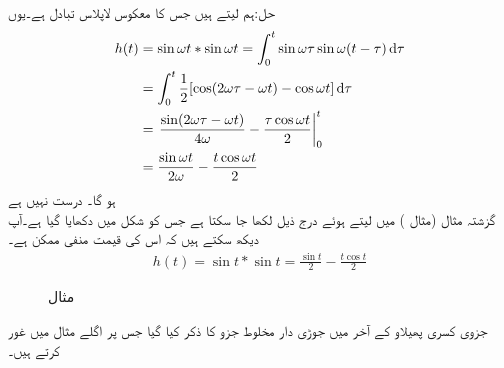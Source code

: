 حل:ہم  لیتے ہیں جس کا معکوس لاپلاس تبادل  ہے۔یوں 
\begin{align*}
h(t)&=\sin \omega t* \sin \omega t=\int_{0}^{t} \sin \omega \tau \sin \omega(t-\tau)\dif \tau\\
&=\int_{0}^{t} \frac{1}{2}[\cos(2\omega \tau-\omega t)-\cos \omega t]\dif \tau\\
&=\left.\frac{\sin(2\omega \tau-\omega t)}{4\omega}-\frac{\tau \cos \omega t}{2}\right|_{0}^{t}\\
&=\frac{\sin \omega t}{2\omega}-\frac{t\cos \omega t}{2}
\end{align*}
ہو گا۔
\quad {} درست نہیں ہے\\
گزشتہ مثال (مثال ) میں   لیتے ہوئے درج ذیل لکھا جا سکتا ہے جس کو شکل  میں دکھایا گیا ہے۔آپ دیکھ سکتے ہیں کہ اس کی قیمت منفی ممکن ہے۔
\begin{align*}
h(t)=\sin t*\sin t=\frac{\sin t}{2}-\frac{t\cos t}{2}
\end{align*}
%
\begin{figure}
\centering
{}
\caption{مثال }
\label{شکل_مثال_لاپلاس_الجھاو_سائن_مربع_دوبارہ}
\end{figure}


جزوی کسری پھیلاو کے آخر میں جوڑی دار مخلوط جزو کا ذکر کیا گیا جس پر اگلے مثال میں غور کرتے ہیں۔

